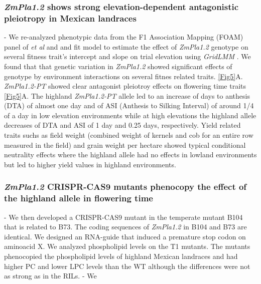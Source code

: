 \documentclass[9pt,twocolumn,twoside]{BioRxiv}
\begin{document}
\subsubsection{\textit{ZmPla1.2} shows strong elevation-dependent antagonistic pleiotropy in Mexican landraces}
- We re-analyzed phenotypic data from the F1 Association Mapping (FOAM) panel of \textit{et al} \cite{Romero_Navarro2017-cn} and \cite{Gates2019-xu} and fit model to estimate the effect of \textit{ZmPla1.2} genotype on several fitness trait's intercept and slope on trial elevation using \textit{GridLMM} \cite{GridLMM2019}. 
We found that that genetic variation in \textit{ZmPla1.2} showed significant effects of genotype by environment interactions on several fitnes related traits. \ref{Fig5}A. 
\textit{ZmPla1.2-PT} showed clear antagonist pleiotroy effects on flowering time traits \ref{Fig5}A. 
The highland \textit{ZmPla1.2-PT} allele  led to an increase of days to anthesis (DTA) of almost one day and of ASI (Anthesis to Silking Interval) of around 1/4 of a day in low elevation environments while at high elevations the highland allele decreases of DTA and ASI of 1 day and 0.25 days, respectively.
Yield related traits suchs as field weight (combined weight of kernels and cob for an entire row measured in the field) and grain weight per hectare showed typical conditional neutrality effects where the highland allele had no effects in lowland environments but led to higher yield values in highland environments.
\subsubsection{\textit{ZmPla1.2} CRISPR-CAS9 mutants phenocopy the effect of the highland allele in flowering time}
- We then developed a CRISPR-CAS9 mutant in the temperate mutant B104 that is related to B73. The coding sequences of \textit{ZmPla1.2} in B104 and B73 are identical. 
We designed an RNA-guide that induced a premature stop codon on aminoacid X.
We analyzed phospholipid levels on the T1 mutants. The mutants phenocopied the phospholipid levels of highland Mexican landraces and had higher PC and lower LPC levels than the WT although the differences were not as strong as in the RILs. %
- We 
\end{document}
